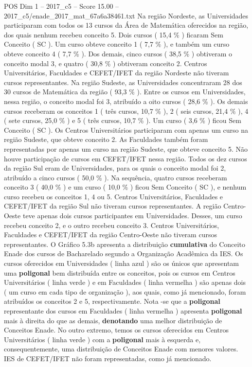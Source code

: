 \begin{textsample}{POS Dim 1 – 2017\_c5 – Score 15.00 – 2017\_c5/enade\_2017\_mat\_67a6a38461.txt}
Na região Nordeste, as Universidades participaram com todos os 13 cursos da Área de Matemática oferecidos na região, dos quais nenhum recebeu conceito 5.
Dois cursos ( 15,4 \% ) ficaram Sem Conceito ( SC ).
Um curso obteve conceito 1 ( 7,7 \% ), e também um curso obteve conceito 4 ( 7,7 \% ).
Dos demais, cinco cursos ( 38,5 \% ) obtiveram o conceito modal 3, e quatro ( 30,8 \% ) obtiveram conceito 2.
Centros Universitários, Faculdades e CEFET/IFET da região Nordeste não tiveram cursos representantes.
Na região Sudeste, as Universidades concentraram 28 dos 30 cursos de Matemática da região ( 93,3 \% ).
Entre os cursos em Universidades, nessa região, o conceito modal foi 3, atribuído a oito cursos ( 28,6 \% ).
Os demais cursos receberam os conceitos 1 ( três cursos, 10,7 \% ), 2 ( seis cursos, 21,4 \% ), 4 ( sete cursos, 25,0 \% ) e 5 ( três cursos, 10,7 \% ).
Um curso ( 3,6 \% ) ficou Sem Conceito ( SC ).
Os Centros Universitários participaram com apenas um curso na região Sudeste, que obteve conceito 2.
As Faculdades também foram representadas por apenas um curso na região Sudeste, que obteve conceito 5.
Não houve participação de cursos em CEFET/IFET nessa região.
Todos os dez cursos da região Sul eram de Universidades, para os quais o conceito modal foi 2, atribuído a cinco cursos ( 50,0 \% ).
Na sequência, quatro cursos receberam conceito 3 ( 40,0 \% ) e um curso ( 10,0 \% ) ficou Sem Conceito ( SC ), e nenhum curso recebeu os conceitos 1, 4 ou 5.
Centros Universitários, Faculdades e CEFET/IFET da região Sul não tiveram cursos representantes.
A região Centro-Oeste teve apenas dois cursos participantes em Universidades.
Desses, um curso recebeu conceito 2, e o outro recebeu conceito 3.
Centros Universitários, Faculdades e CEFET/IFET da região Centro-Oeste não tiveram cursos representantes.
O Gráfico 5.3b apresenta a distribuição \textbf{cumulativa} do Conceito Enade dos cursos de Bacharelado segundo a Organização Acadêmica da IES.
Os cursos oferecidos em Universidades ( linha azul ) são os únicos que apresentam uma \textbf{poligonal} bem distribuída entre os conceitos, pois os cursos em Centros Universitários ( linha verde ) e em Faculdades ( linha vermelha ) são apenas dois ( um curso em cada tipo de organização ), aos quais, como já mencionado, foram atribuídos os conceitos 2 e 5, respectivamente.
Nota -se que a \textbf{poligonal} representante dos cursos em Faculdades ( linha vermelha ) apresenta \textbf{poligonal} mais à direita do que as demais, \textbf{denotando} uma melhor distribuição de Conceitos Enade.
No outro extremo, temos os cursos oferecidos em Centros Universitários ( linha verde ) com a \textbf{poligonal} mais à esquerda e, consequentemente, uma distribuição de Conceitos Enade com menores valores.
IES de CEFET/IFET não foram representadas, como já mencionado.

\end{textsample}
